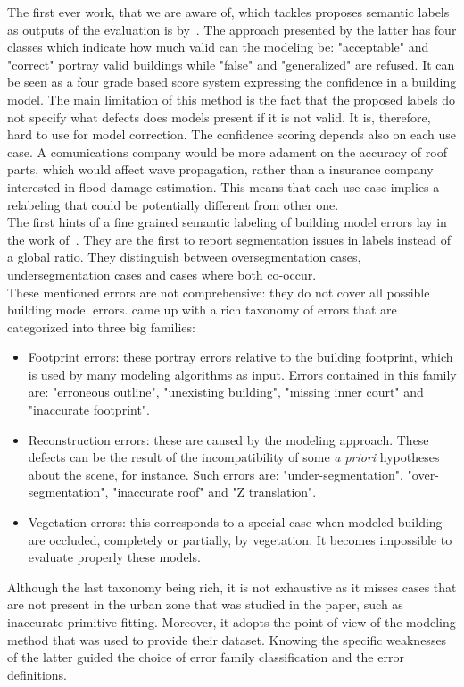             The first ever work, that we are aware of, which tackles proposes semantic labels as outputs of the evaluation is by~\textcite{boudet2006supervised}.
            The approach presented by the latter has four classes which indicate how much valid can the modeling be: "acceptable" and "correct" portray valid buildings while "false" and "generalized" are refused.
            It can be seen as a four grade based score system expressing the confidence in a building model.
            The main limitation of this method is the fact that the proposed labels do not specify what defects does models present if it is not valid.
            It is, therefore, hard to use for model correction.
            The confidence scoring depends also on each use case.
            A comunications company would be more adament on the accuracy of roof parts, which would affect wave propagation, rather than a insurance company interested in flood damage estimation.
            This means that each use case implies a relabeling that could be potentially different from other one.\\
            The first hints of a fine grained semantic labeling of building model errors lay in the work of~\textcite{rottensteiner2014results}.
            They are the first to report segmentation issues in labels instead of a global ratio.
            They distinguish between oversegmentation cases, undersegmentation cases and cases where both co-occur.\\
            These mentioned errors are not comprehensive: they do not cover all possible building model errors.
            \textcite{michelin2013quality} came up with a rich taxonomy of errors that are categorized into three big families:
            \begin{itemize}
                \item Footprint errors: these portray errors relative to the building footprint, which is used by many modeling algorithms as input.
                        Errors contained in this family are: "erroneous outline", "unexisting building", "missing inner court" and "inaccurate footprint".
                \item Reconstruction errors: these are caused by the modeling approach.
                        These defects can be the result of the incompatibility of some \textit{a priori} hypotheses about the scene, for instance.
                        Such errors are: "under-segmentation", "over-segmentation", "inaccurate roof" and "Z translation".
                \item Vegetation errors: this corresponds to a special case when modeled building are occluded, completely or partially, by vegetation.
                        It becomes impossible to evaluate properly these models.
            \end{itemize}
            Although the last taxonomy being rich, it is not exhaustive as it misses cases that are not present in the urban zone that was studied in the paper, such as inaccurate primitive fitting.
            Moreover, it adopts the point of view of the modeling method that was used to provide their dataset.
            Knowing the specific weaknesses of the latter guided the choice of error family classification and the error definitions.

